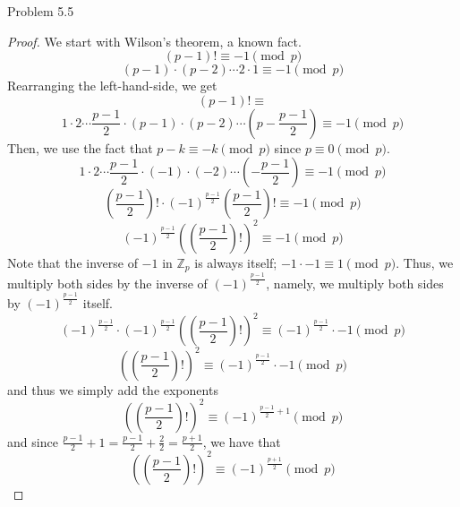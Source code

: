 \begin{sol}{Problem 5.5}
\begin{proof}
We start with Wilson's theorem, a known fact.
\[
(p-1)! \equiv -1 \pmod{p}
\]
\[
(p-1) \cdot (p-2) \cdots 2 \cdot 1 \equiv -1 \pmod{p}
\]
Rearranging the left-hand-side, we get
\[
(p-1)! \equiv 
\]
\[
1 \cdot 2 \cdots \frac{p-1}{2}\cdot (p-1) \cdot (p-2) \cdots \left(p - \frac{p-1}{2}\right) \equiv -1\pmod{p}
\]
Then, we use the fact that $p - k \equiv -k \pmod{p}$ since $p \equiv 0 \pmod{p}$.
\[
1 \cdot 2 \cdots \frac{p-1}{2}  \cdot (-1) \cdot (-2) \cdots \left(-\frac{p-1}{2}\right) \equiv -1\pmod{p}
\]
\[
\left(\frac{p-1}{2}\right)! \cdot (-1)^{\frac{p-1}{2}} \left(\frac{p-1}{2}\right)! \equiv -1\pmod{p}
\]
\[
(-1)^{\frac{p-1}{2}}\left(\left(\frac{p-1}{2}\right)!\right)^2 \equiv -1 \pmod{p}
\]
Note that the inverse of $-1$ in $\mathbb{Z}_p$ is always itself; $-1 \cdot -1 \equiv 1 \pmod{p}$. Thus, we multiply both sides by the inverse of $(-1)^{\frac{p-1}{2}}$, namely, we multiply both sides by $(-1)^{\frac{p-1}{2}}$ itself.
\[
(-1)^{\frac{p-1}{2}} \cdot (-1)^{\frac{p-1}{2}}\left(\left(\frac{p-1}{2}\right)!\right)^2 \equiv (-1)^{\frac{p-1}{2}}\cdot -1 \pmod{p}
\]
\[
\left(\left(\frac{p-1}{2}\right)!\right)^2 \equiv (-1)^{\frac{p-1}{2}}\cdot -1 \pmod{p}
\]
and thus we simply add the exponents
\[
\left(\left(\frac{p-1}{2}\right)!\right)^2 \equiv (-1)^{\frac{p-1}{2} + 1} \pmod{p}
\]
and since $\frac{p-1}{2} + 1 = \frac{p-1}{2} + \frac{2}{2} = \frac{p+1}{2}$, we have that
\[
\left(\left(\frac{p-1}{2}\right)!\right)^2 \equiv (-1)^{\frac{p+1}{2}} \pmod{p}
\]
\end{proof}
\end{sol}

